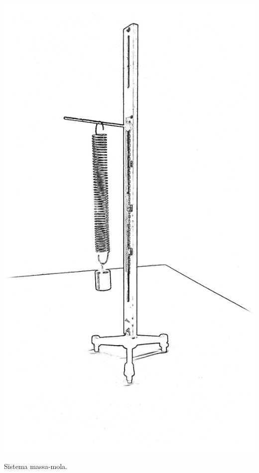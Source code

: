 \begin{marginfigure}
	\includegraphics[width=\textwidth]{Ilustrations/Massa-Mola.png}
	\caption{Sistema massa-mola.}
\end{marginfigure}

